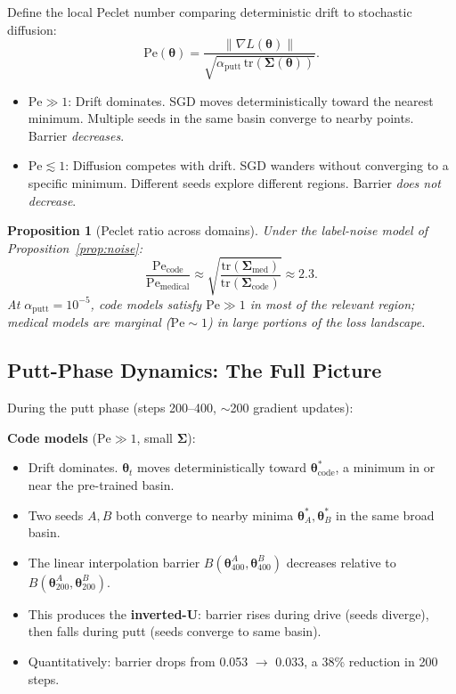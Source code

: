 \documentclass{article}
\newtheorem{proposition}{Proposition}
\newcommand{\btheta}{\boldsymbol{\theta}}
\newcommand{\bSigma}{\boldsymbol{\Sigma}}
\begin{document}
Define the local Peclet number comparing deterministic drift to stochastic diffusion:
\begin{equation}
\mathrm{Pe}(\btheta) = \frac{\|\nabla L(\btheta)\|}{\sqrt{\alpha_{\text{putt}} \, \mathrm{tr}(\bSigma(\btheta))}}.
\end{equation}

\begin{itemize}
\item $\mathrm{Pe} \gg 1$: Drift dominates.  SGD moves deterministically
      toward the nearest minimum.  Multiple seeds in the same basin converge
      to nearby points.  Barrier \emph{decreases}.
\item $\mathrm{Pe} \lesssim 1$: Diffusion competes with drift.  SGD wanders
      without converging to a specific minimum.  Different seeds explore
      different regions.  Barrier \emph{does not decrease}.
\end{itemize}

\begin{proposition}[Peclet ratio across domains]
Under the label-noise model of Proposition~\ref{prop:noise}:
\begin{equation}
\frac{\mathrm{Pe}_{\text{code}}}{\mathrm{Pe}_{\text{medical}}}
\approx \sqrt{\frac{\mathrm{tr}(\bSigma_{\text{med}})}{\mathrm{tr}(\bSigma_{\text{code}})}} \approx 2.3.
\end{equation}
At $\alpha_{\text{putt}} = 10^{-5}$, code models satisfy $\mathrm{Pe} \gg 1$
in most of the relevant region; medical models are marginal ($\mathrm{Pe} \sim 1$)
in large portions of the loss landscape.
\end{proposition}

\subsection{Putt-Phase Dynamics: The Full Picture}

During the putt phase (steps 200--400, $\sim$200 gradient updates):

\noindent\textbf{Code models} ($\mathrm{Pe} \gg 1$, small $\bSigma$):
\begin{itemize}
\item Drift dominates.  $\btheta_t$ moves deterministically toward
      $\btheta^*_{\text{code}}$, a minimum in or near the pre-trained basin.
\item Two seeds $A, B$ both converge to nearby minima $\btheta^*_A, \btheta^*_B$
      in the same broad basin.
\item The linear interpolation barrier $B(\btheta^A_{400}, \btheta^B_{400})$
      decreases relative to $B(\btheta^A_{200}, \btheta^B_{200})$.
\item This produces the \textbf{inverted-U}: barrier rises during drive
      (seeds diverge), then falls during putt (seeds converge to same basin).
\item Quantitatively: barrier drops from 0.053 $\to$ 0.033, a 38\%
      reduction in 200 steps.
\end{itemize}
\end{document}
